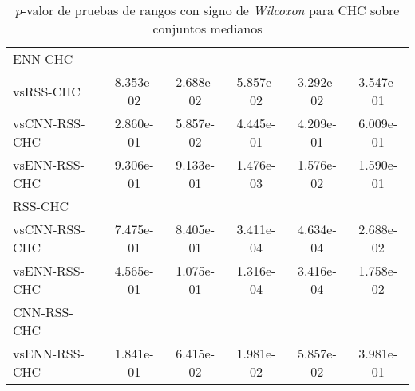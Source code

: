 \begin{table}[h!]
\begin{adjustbox}{max width =\textwidth}
\begin{tabular}{l c c c c c}
\hline

ENN-CHC\\
vsRSS-CHC & 8.353e-02 & 2.688e-02 & 5.857e-02 & 3.292e-02 & 3.547e-01 \\
vsCNN-RSS-CHC & 2.860e-01 & 5.857e-02 & 4.445e-01 & 4.209e-01 & 6.009e-01 \\  
vsENN-RSS-CHC & 9.306e-01 & 9.133e-01 & 1.476e-03 & 1.576e-02 & 1.590e-01 \\ 

\hline

RSS-CHC\\
vsCNN-RSS-CHC & 7.475e-01 & 8.405e-01 & 3.411e-04 & 4.634e-04 & 2.688e-02 \\
vsENN-RSS-CHC & 4.565e-01 & 1.075e-01 & 1.316e-04 & 3.416e-04 & 1.758e-02 \\

\hline

CNN-RSS-CHC\\
vsENN-RSS-CHC  & 1.841e-01 & 6.415e-02 & 1.981e-02 & 5.857e-02 & 3.981e-01 \\

\hline


\end{tabular}
\end{adjustbox}
\caption[Pruebas de \emph{Wilcoxon} entre CHC y variaciones para conjuntos medianos]{$p$-valor de pruebas de rangos con signo de \emph{Wilcoxon} para CHC sobre conjuntos medianos}
\label{wilcox-CHC-med}
\end{table}

